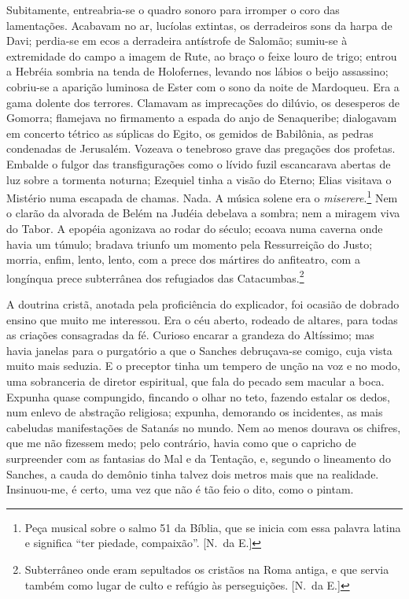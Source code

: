 Subitamente, entreabria{}-se o quadro sonoro para
irromper o coro das lamentações. Acabavam no ar, lucíolas extintas, os
derradeiros sons da harpa de Davi; perdia{}-se em ecos a derradeira
antístrofe de Salomão; sumiu{}-se à extremidade do campo a imagem de
Rute, ao braço o feixe louro de trigo; entrou a Hebréia sombria na
tenda de Holofernes, levando nos lábios o beijo assassino; cobriu{}-se
a aparição luminosa de Ester com o sono da noite de Mardoqueu. Era a
gama dolente dos terrores. Clamavam as imprecações do dilúvio, os
desesperos de Gomorra; flamejava no firmamento a espada do anjo de
Senaqueribe; dialogavam em concerto tétrico as súplicas do Egito, os
gemidos de Babilônia, as pedras condenadas de Jerusalém. Vozeava o
tenebroso grave das pregações dos profetas. Embalde o fulgor das
transfigurações como o lívido fuzil escancarava abertas de luz sobre a
tormenta noturna; Ezequiel tinha a visão do Eterno; Elias visitava o
Mistério numa escapada de chamas. Nada. A música solene era o 
\textit{miserere}.\footnote{ Peça musical sobre o salmo 51 da Bíblia, 
que se inicia com essa palavra latina e significa ``ter piedade, compaixão''. [N.~da E.]}
Nem o clarão da alvorada de Belém na Judéia debelava a sombra; nem a
miragem viva do Tabor. A epopéia agonizava ao rodar do século; ecoava
numa caverna onde havia um túmulo; bradava triunfo um momento pela
Ressurreição do Justo; morria, enfim, lento, lento, com a prece dos
mártires do anfiteatro, com a longínqua prece subterrânea dos
refugiados das Catacumbas.\footnote{ Subterrâneo onde eram sepultados os cristãos na Roma antiga, 
e que servia também como lugar de culto e refúgio às perseguições. [N.~da E.]} 

A doutrina cristã, anotada pela proficiência
do explicador, foi ocasião de dobrado ensino que muito me interessou.
Era o céu aberto, rodeado de altares, para todas as criações
consagradas da fé. Curioso encarar a grandeza do Altíssimo; mas havia
janelas para o purgatório a que o Sanches debruçava{}-se comigo, cuja
vista muito mais seduzia. E o preceptor tinha um tempero de unção na
voz e no modo, uma sobranceria de diretor espiritual, que fala do
pecado sem macular a boca. Expunha quase compungido, fincando o olhar
no teto, fazendo estalar os dedos, num enlevo de abstração religiosa;
expunha, demorando os incidentes, as mais cabeludas manifestações de
Satanás no mundo. Nem ao menos dourava os chifres, que me não fizessem
medo; pelo contrário, havia como que o capricho de surpreender com as
fantasias do Mal e da Tentação, e, segundo o lineamento do Sanches, a
cauda do demônio tinha talvez dois metros mais que na realidade.
Insinuou{}-me, é certo, uma vez que não é tão feio o dito, como o
pintam. 

